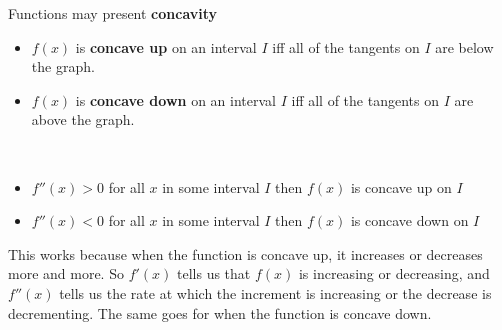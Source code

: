 \documentclass{article}
\begin{document}
\begin{minipage}{0.5\textwidth}
\end{minipage}
\begin{minipage}{0.5\textwidth}
    Functions may present \textbf{concavity}
    \hphantom{ } \\
    \begin{itemize}
        \item \(f(x)\) is \textbf{concave up} on an interval \(I\) iff all of the tangents on \(I\) are below the graph.
        \item \(f(x)\) is \textbf{concave down} on an interval \(I\) iff all of the tangents on \(I\) are above the graph.
    \end{itemize}
    \hphantom{ } \\
    \begin{itemize}
        \item \(f''(x)>0\) for all \(x\) in some interval \(I\) then \(f(x)\) is concave up on \(I\)
        \item \(f''(x)<0\) for all \(x\) in some interval \(I\) then \(f(x)\) is concave down on \(I\)
    \end{itemize}

    This works because when the function is concave up, it increases or decreases more and more. So \(f'(x)\)
    tells us that \(f(x)\) is increasing or decreasing, and \(f''(x)\) tells us the rate at which the increment
    is increasing or the decrease is decrementing. The same goes for when the function is concave down.
\end{minipage}
\end{document}
